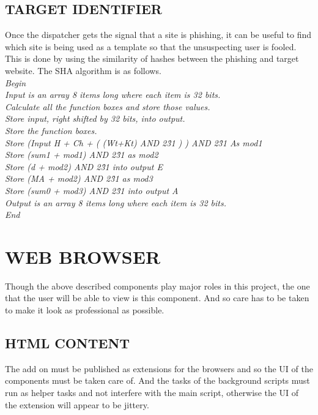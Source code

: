 \subsection{TARGET IDENTIFIER}
Once the dispatcher gets the signal that a site is phishing, it can be useful to find which site is being used as a template so that the unsuspecting user is fooled. This is done by using the similarity of hashes between the phishing and target website. The SHA algorithm is as follows.\\
\null\quad\textit{Begin}\\
\null\quad\quad\textit{Input is an array 8 items long where each item is 32 bits.}\\
\null\quad\quad\textit{Calculate all the function boxes and store those values. }\\
\null\quad\quad\textit{Store input, right shifted by 32 bits, into output. }\\
\null\quad\quad\textit{Store the function boxes.}\\
\null\quad\quad\textit{Store (Input H + Ch + ( (Wt+Kt) AND 2\^31 ) ) AND 2\^31 As mod1}\\
\null\quad\quad\textit{Store (sum1 + mod1) AND 2\^31 as mod2}\\
\null\quad\quad\textit{Store (d + mod2) AND 2\^31 into output E }\\
\null\quad\quad\textit{Store (MA + mod2) AND 2\^31 as mod3}\\
\null\quad\quad\textit{Store (sum0 + mod3) AND 2\^31 into output A}\\
\null\quad\quad\textit{Output is an array 8 items long where each item is 32 bits.}\\
\null\quad\textit{End}\\

\section{WEB BROWSER}
Though the above described components play major roles in this project, the one that the user will be able to view is this component. And so care has to be taken to make it look as professional as possible.

\subsection{HTML CONTENT}
The add on must be published as extensions for the browsers and so the UI of the components must be taken care of. And the tasks of the background scripts must run as helper tasks and not interfere with the main script, otherwise the UI of the extension will appear to be jittery.

